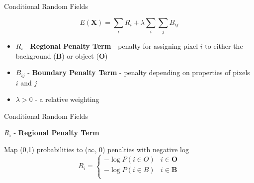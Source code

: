 \documentclass[10pt]{beamer}
\begin{document}
\begin{frame}[fragile]{Conditional Random Fields}

    \begin{equation}
      E(\mathbf{X}) = \sum_{i} R_{i} + \lambda \sum_{i} \sum_{j} B_{ij}
      \label{eq:costFunc}
    \end{equation}

    \begin{itemize}
    \item $R_{i}$ - \textbf{Regional Penalty Term} - penalty for assigning pixel $i$ to either the background (\textbf{B}) or object (\textbf{O})
    \item $B_{ij}$ - \textbf{Boundary Penalty Term} - penalty depending on properties of pixels $i$ and $j$
    \item $\lambda > 0$ - a relative weighting
    \end{itemize}
    
\end{frame}


\begin{frame}[fragile]{Conditional Random Fields}

  $R_{i}$ - \textbf{Regional Penalty Term}

  Map (0,1) probabilities to ($\infty$, 0) penalties with negative log
  \pause  
  \begin{equation} R_{i} = \begin{cases} 
      -\log P(i \in O) & i \in \mathbf{O} \\
      -\log P(i \in B) & i \in \mathbf{B} \\
   \end{cases}
  \end{equation}
    
\end{frame}
\end{document}
